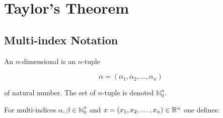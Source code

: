 % 
% 
% 
% 
\section{Taylor's Theorem}


\subsection{Multi-index Notation}

An $n$-dimensional  is an $n$-{tuple}

\[\alpha = (\alpha_1, \alpha_2,\ldots,\alpha_n)\]

of natural number.
The set of $n$-{tuple} is denoted \(\mathbb{N}^n_0\).

For multi-indices \(\alpha, \beta \in \mathbb{N}^n_0\) and
\(x = (x_1, x_2, \ldots, x_n) \in \mathbb{R}^n\) one defines:


